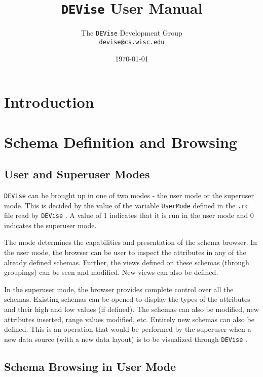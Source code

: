 
\def\Devise{{\tt DEVise} }
\def\filename#1{{\tt #1} }
\def\code#1{{\tt #1} }
\def\term#1{#1 }
\def\variable#1{{\tt #1} }


\title{\Devise User Manual}
\author{The \Devise Development Group \\
\code{devise@cs.wisc.edu}
}
\date{\today}

\maketitle

\section{Introduction}

\section{Schema Definition and Browsing}

\subsection{User and Superuser Modes}

\Devise can be brought up in one of two modes - the user mode or the
superuser mode.  This is decided by the value of the variable
\variable{UserMode} defined in the \filename{.rc} file read by
\Devise.  A value of 1 indicates that it is run in the user mode and 0
indicates the superuser mode.

The mode determines the capabilities and presentation of the schema
browser.  In the user mode, the browser can be user to inspect the
attributes in any of the already defined schemas. Further, the views
defined on these schemas (through groupings) can be seen and
modified. New views can also be defined.

In the superuser mode, the browser provides complete control over all
the schemas. Existing schemas can be opened to display the types of
the attributes and their high and low values (if defined). The schemas
can also be modified, new attributes inserted, range values modified,
etc. Entirely new schemas can also be defined.  This is an operation
that would be performed by the superuser when a new data source (with
a new data layout) is to be visualized through \Devise.

\subsection{Schema Browsing in User Mode}

